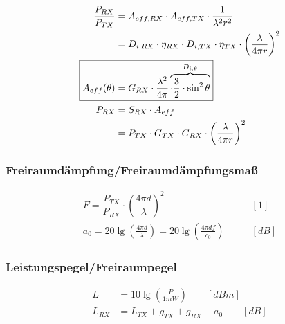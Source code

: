 \begin{align*}
    \frac{P_{RX}}{P_{TX}} & = A_{eff,RX}\cdot A_{eff,TX}\cdot\frac{1}{\lambda^2r^2}                                            \\
                          & = D_{i,RX}\cdot\eta_{RX}\cdot D_{i,TX}\cdot\eta_{TX}\cdot\left(\frac{\lambda}{4\pi r}\right)^2     \\
    \Aboxed{A_{eff}(\theta)   & = G_{RX}\cdot\frac{\lambda^2}{4\pi}\overbrace{\cdot\frac{3}{2}\cdot\sin^2\theta}^{{D_{i,\theta}}}} \\
    P_{RX}                & = S_{RX}\cdot A_{eff}                                                                                  \\
                          & = P_{TX}\cdot G_{TX}\cdot G_{RX}\cdot \left(\frac{\lambda}{4\pi r}\right)^2
\end{align*}

\subsubsection{Freiraumdämpfung/Freiraumdämpfungsmaß}
\begin{align*}
    F = \dfrac{P_{TX}}{P_{RX}} \cdot \left(\dfrac{4 \pi d}{\lambda}\right)^2                         & \qquad [1]       \\
    a_{0} = 20 \lg \left(\frac{4 \pi d}{\lambda}\right) =20 \lg \left(\frac{4 \pi d f}{c_{0}}\right) & \qquad [\si{dB}]
\end{align*}

\subsubsection{Leistungspegel/Freiraumpegel}
\begin{align*}
    L      & = 10 \lg \left(\frac{P}{1 mW}\right) \qquad [\si{dBm}] \\
    L_{RX} & = L_{TX}+g_{TX}+g_{RX}-a_{0} \qquad [\si{dB}]
\end{align*}
